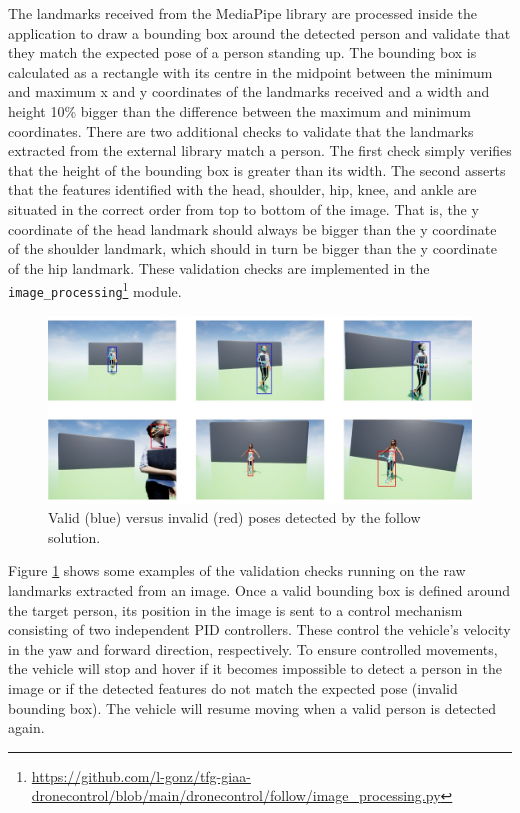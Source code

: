 The landmarks received from the MediaPipe library are processed inside the application to draw a bounding box around the detected person and validate that they match the expected pose of a person standing up. The bounding box is calculated as a rectangle with its centre in the midpoint between the minimum and maximum x and y coordinates of the landmarks received and a width and height 10\% bigger than the difference between the maximum and minimum coordinates. There are two additional checks to validate that the landmarks extracted from the external library match a person. The first check simply verifies that the height of the bounding box is greater than its width. The second asserts that the features identified with the head, shoulder, hip, knee, and ankle are situated in the correct order from top to bottom of the image. That is, the y coordinate of the head landmark should always be bigger than the y coordinate of the shoulder landmark, which should in turn be bigger than the y coordinate of the hip landmark. These validation checks are implemented in the \texttt{image\_processing}\footnote{\url{https://github.com/l-gonz/tfg-giaa-dronecontrol/blob/main/dronecontrol/follow/image_processing.py}} module.

\begin{figure}[H]
  \centering
  \includegraphics[width=\textwidth, keepaspectratio]{img/pose-validation.jpg}
  \caption{Valid (blue) versus invalid (red) poses detected by the follow solution.}
  \label{fig:pose-validation}
\end{figure}

Figure \ref{fig:pose-validation} shows some examples of the validation checks running on the raw landmarks extracted from an image. Once a valid bounding box is defined around the target person, its position in the image is sent to a control mechanism consisting of two independent PID controllers. These control the vehicle's velocity in the yaw and forward direction, respectively. To ensure controlled movements, the vehicle will stop and hover if it becomes impossible to detect a person in the image or if the detected features do not match the expected pose (invalid bounding box). The vehicle will resume moving when a valid person is detected again.

